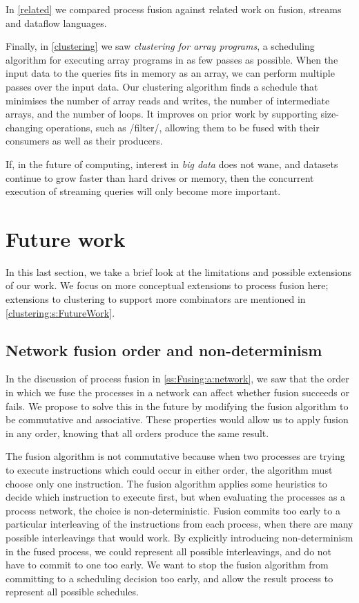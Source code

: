 In \cref{related} we compared process fusion against related work on fusion, streams and dataflow languages.

Finally, in \cref{clustering} we saw \emph{clustering for array programs}, a scheduling algorithm for executing array programs in as few passes as possible.
When the input data to the queries fits in memory as an array, we can perform multiple passes over the input data.
Our clustering algorithm finds a schedule that minimises the number of array reads and writes, the number of intermediate arrays, and the number of loops.
It improves on prior work by supporting size-changing operations, such as \Hs/filter/, allowing them to be fused with their consumers as well as their producers.

If, in the future of computing, interest in \emph{big data} does not wane, and datasets continue to grow faster than hard drives or memory, then the concurrent execution of streaming queries will only become more important.

\section{Future work}
\label{related/future}

In this last section, we take a brief look at the limitations and possible extensions of our work.
We focus on more conceptual extensions to process fusion here; extensions to clustering to support more combinators are mentioned in \cref{clustering:s:FutureWork}.

\subsection{Network fusion order and non-determinism}

In the discussion of process fusion in \cref{ss:Fusing:a:network}, we saw that the order in which we fuse the processes in a network can affect whether fusion succeeds or fails.
We propose to solve this in the future by modifying the fusion algorithm to be commutative and associative.
These properties would allow us to apply fusion in any order, knowing that all orders produce the same result.

The fusion algorithm is not commutative because when two processes are trying to execute instructions which could occur in either order, the algorithm must choose only one instruction.
The fusion algorithm applies some heuristics to decide which instruction to execute first, but when evaluating the processes as a process network, the choice is non-deterministic.
Fusion commits too early to a particular interleaving of the instructions from each process, when there are many possible interleavings that would work.
By explicitly introducing non-determinism in the fused process, we could represent all possible interleavings, and do not have to commit to one too early.
We want to stop the fusion algorithm from committing to a scheduling decision too early, and allow the result process to represent all possible schedules.

